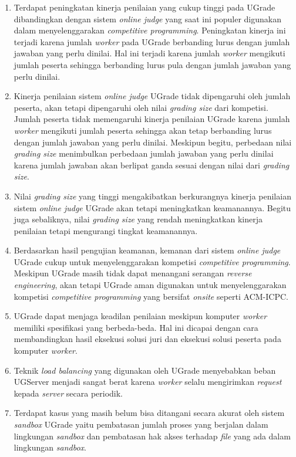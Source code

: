 \begin{enumerate}
    \item Terdapat peningkatan kinerja penilaian yang cukup tinggi pada UGrade dibandingkan dengan sistem \textit{online judge} yang saat ini populer digunakan dalam menyelenggarakan \textit{competitive programming}. Peningkatan kinerja ini terjadi karena jumlah \textit{worker} pada UGrade berbanding lurus dengan jumlah jawaban yang perlu dinilai. Hal ini terjadi karena jumlah \textit{worker} mengikuti jumlah peserta sehingga berbanding lurus pula dengan jumlah jawaban yang perlu dinilai.
    \item Kinerja penilaian sistem \textit{online judge} UGrade tidak dipengaruhi oleh jumlah peserta, akan tetapi dipengaruhi oleh nilai \textit{grading size} dari kompetisi. Jumlah peserta tidak memengaruhi kinerja penilaian UGrade karena jumlah \textit{worker} mengikuti jumlah peserta sehingga akan tetap berbanding lurus dengan jumlah jawaban yang perlu dinilai. Meskipun begitu, perbedaan nilai \textit{grading size} menimbulkan perbedaan jumlah jawaban yang perlu dinilai karena jumlah jawaban akan berlipat ganda sesuai dengan nilai dari \textit{grading size}.
    \item Nilai \textit{grading size} yang tinggi mengakibatkan berkurangnya kinerja penilaian sistem \textit{online judge} UGrade akan tetapi meningkatkan keamanannya. Begitu juga sebaliknya, nilai \textit{grading size} yang rendah meningkatkan kinerja penilaian tetapi mengurangi tingkat keamanannya.
    \item Berdasarkan hasil pengujian keamanan, kemanan dari sistem \textit{online judge} UGrade cukup untuk menyelenggarakan kompetisi \textit{competitive programming}. Meskipun UGrade masih tidak dapat menangani serangan \textit{reverse engineering}, akan tetapi UGrade aman digunakan untuk menyelenggarakan kompetisi \textit{competitive programming} yang bersifat \textit{onsite} seperti ACM-ICPC.
    \item UGrade dapat menjaga keadilan penilaian meskipun komputer \textit{worker} memiliki spesifikasi yang berbeda-beda. Hal ini dicapai dengan cara membandingkan hasil eksekusi solusi juri dan eksekusi solusi peserta pada komputer \textit{worker}.
    \item Teknik \textit{load balancing} yang digunakan oleh UGrade menyebabkan beban UGServer menjadi sangat berat karena \textit{worker} selalu mengirimkan \textit{request} kepada \textit{server} secara periodik.
    \item Terdapat kasus yang masih belum bisa ditangani secara akurat oleh sistem \textit{sandbox} UGrade yaitu pembatasan jumlah proses yang berjalan dalam lingkungan \textit{sandbox} dan pembatasan hak akses terhadap \textit{file} yang ada dalam lingkungan \textit{sandbox}.
\end{enumerate}

